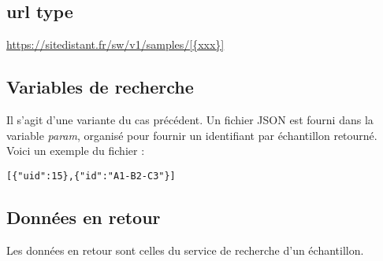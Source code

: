 \subsection{url type}
\url{https://sitedistant.fr/sw/v1/samples/[{xxx}]}
\subsection{Variables de recherche}
Il s'agit d'une variante du cas précédent. Un fichier JSON est fourni dans la variable \textit{param}, organisé pour fournir un identifiant par échantillon retourné. Voici un exemple du fichier :
\begin{lstlisting}
[{"uid":15},{"id":"A1-B2-C3"}]
\end{lstlisting}
\subsection{Données en retour}
Les données en retour sont celles du service de recherche d'un échantillon.



